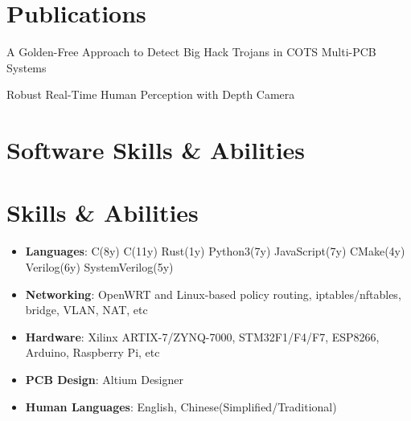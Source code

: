 \documentclass[letterpaper,11pt]{article}
\newcommand{\resumeSubHeadingListStart}{\begin{itemize}[leftmargin=0pt,label={}]}
\newcommand{\resumeSubHeadingListEnd}{\end{itemize}}
\begin{document}
\section{Publications}{
    \resumeSubHeadingListStart
        {A Golden-Free Approach to Detect Big Hack Trojans in COTS Multi-PCB Systems}

        {Robust Real-Time Human Perception with Depth Camera}

    \vspace{0.5ex}
    \resumeSubHeadingListEnd
}

    \newcommand{\resumeSkillItem}[2]{\item{\textbf{#1}{: #2}}}

        \section{Software Skills \& Abilities}
        \section{Skills \& Abilities}
    \resumeSubHeadingListStart
        \setlength\topsep{0ex}\setlength\parskip{0ex}\setlength\itemsep{0.2ex}
        \vspace{-0.2ex}

        \resumeSkillItem{Languages}{C(8y) C\raisebox{0.2ex}{++}(11y) Rust(1y) Python3(7y) JavaScript(7y) CMake(4y) Verilog(6y) SystemVerilog(5y)}
        \resumeSkillItem{Networking}{OpenWRT and Linux-based policy routing, iptables/nftables, bridge, VLAN, NAT, etc}

            \resumeSkillItem{Hardware}{Xilinx ARTIX-7/ZYNQ-7000, STM32F1/F4/F7, ESP8266, Arduino, Raspberry Pi, etc}
            \resumeSkillItem{PCB Design}{Altium Designer}
        \resumeSkillItem{Human Languages}{English, Chinese(Simplified/Traditional)}
    \vspace{-1ex}
    \resumeSubHeadingListEnd
\end{document}
